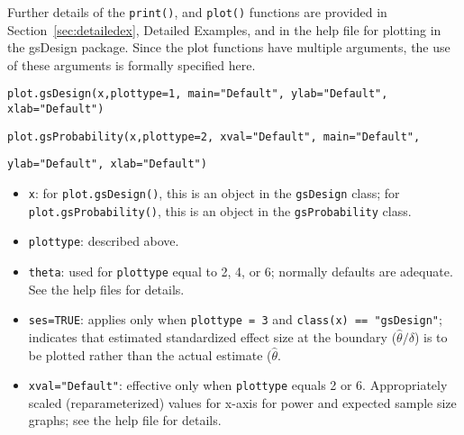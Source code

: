 \bigskip


Further details of the \texttt{print()}, and \texttt{plot()} functions are
provided in Section~\ref{sec:detailedex}, Detailed Examples, and in the help 
file for plotting in the gsDesign
package. Since the plot functions have multiple arguments, the use of these
arguments is formally specified here.

\bigskip

\texttt{plot.gsDesign(x,plottype=1, main="Default", ylab="Default",
xlab="Default")}

\texttt{plot.gsProbability(x,plottype=2, xval="Default", main="Default",}

\texttt{\qquad ylab="Default", xlab="Default")}

\bigskip

\begin{itemize}
\item \texttt{x}: for \texttt{plot.gsDesign()}, this is an object in the
\texttt{gsDesign} class; for \texttt{plot.gsProbability()}, this is an 
object in the \texttt{gsProbability} class.

\item \texttt{plottype}: described above.

\item \texttt{theta}: used for \texttt{plottype} equal to 2, 4, or 6; normally 
defaults are adequate. See the help files for details.

\item \texttt{ses=TRUE}: applies only when \texttt{plottype = 3} and 
\texttt{class(x) == "gsDesign"};
indicates that estimated standardized effect size at the boundary
($\hat{\theta}/\delta$) is to be plotted rather than the actual estimate
($\hat{\theta}$.

\item \texttt{xval="Default"}: effective only when \texttt{plottype} equals 2 
or 6.  Appropriately scaled (reparameterized) values for x-axis for power and
expected sample size graphs; see the help file for details.
\end{itemize}

